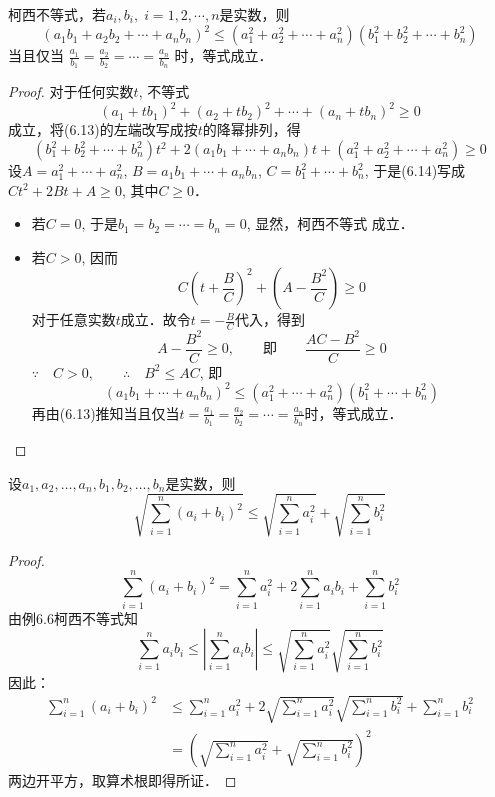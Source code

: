 \begin{example}
    柯西不等式，若$a_i,b_i,\; i=1,2,\cdots ,n$是实数，则
\[(a_1b_1+a_2b_2+\cdots +a_nb_n)^2\le (a_1^2+a_2^2+\cdots +a_n^2)(b_1^2+b_2^2+\cdots+b_n^2)\]
当且仅当
$\frac{a_1}{b_1}=\frac{a_2}{b_2}=\cdots=\frac{a_n}{b_n}$
时，等式成立．
\end{example}

\begin{proof}
对于任何实数$t$, 不等式
\begin{equation}
    (a_1+tb_1)^2+(a_2+tb_2)^2+\cdots +(a_n+tb_n)^2\ge 0
\end{equation}
成立，将(6.13)的左端改写成按$t$的降幂排列，得
\begin{equation}
   ( b^2_1+b^2_2+\cdots +b^2_n)t^2+2(a_1b_1+\cdots +a_nb_n)t+(a^2_1+a_2^2+
\cdots +a_n^2)\ge 0
\end{equation} 
设$A=a^2_1+\cdots +a_n^2$, $B=a_1b_1+\cdots +a_nb_n$,
$C=b^2_1+\cdots +b^2_n$, 
于是(6.14)写成
$Ct^2+2Bt+A\ge 0$, 其中$C\ge 0$．
\begin{itemize}
    \item 若$C=0$, 于是$b_1=b_2=\cdots =b_n=0$, 显然，柯西不等式
成立．
\item 若$C>0$, 因而$$C\left(t+\frac{B}{C}\right)^2+\left(A-\frac{B^2}{C}\right)\ge 0$$
对于任意实数$t$成立．故令$t=-\frac{B}{C}$代入，得到
\[A-\frac{B^2}{C}\ge 0,\qquad \text{即}\qquad \frac{AC-B^2}{C}\ge 0\]
$\because\quad C>0,\qquad \therefore\quad B^2\le AC$, 即
\[(a_1b_1+\cdots +a_nb_n)^2\le (a^2_1+\cdots +a^2_n)(b^2_1+\cdots +b^2_n)\]
再由(6.13)推知当且仅当$t=\frac{a_1}{b_1}=\frac{a_2}{b_2}=\cdots=\frac{a_n}{b_n}$时，等式成立．
\end{itemize}
\end{proof}

\begin{example}
    设$a_1,a_2,\ldots,a_n,b_1,b_2,\ldots,b_n$是实数，则
\[\sqrt{\sum^n_{i=1}(a_i+b_i)^2}\le \sqrt{\sum^n_{i=1}a^2_i}+\sqrt{\sum^n_{i=1}b^2_i}\]
\end{example}

\begin{proof}
 \[   \sum^n_{i=1}(a_i+b_i)^2=\sum^n_{i=1}a_i^2+2\sum^n_{i=1}a_ib_i+\sum^n_{i=1}b_i^2\]
由例6.6柯西不等式知
\[\sum^n_{i=1}a_ib_i\le\left|\sum^n_{i=1}a_ib_i\right|\le \sqrt{\sum^n_{i=1}a_i^2}\sqrt{\sum^n_{i=1}b_i^2}\]
因此：
\[\begin{split}
    \sum^n_{i=1}(a_i+b_i)^2&\le \sum^n_{i=1}a_i^2+2\sqrt{\sum^n_{i=1}a_i^2}\sqrt{\sum^n_{i=1}b_i^2}+\sum^n_{i=1}b_i^2\\
    &=\left(\sqrt{\sum^n_{i=1}a^2_i}+\sqrt{\sum^n_{i=1}b^2_i}\right)^2
\end{split}\]
两边开平方，取算术根即得所证．
\end{proof}    

